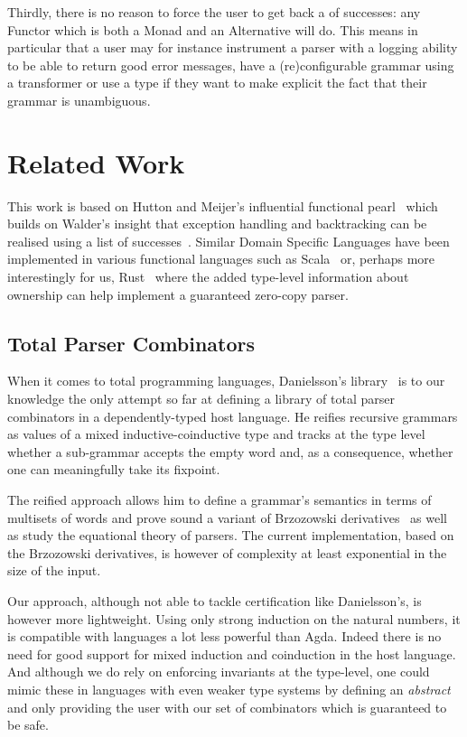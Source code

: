 Thirdly, there is no reason to force the user to get back a 
of successes: any Functor which is both a Monad and an Alternative
will do. This means in particular that a user may for instance instrument
a parser with a logging ability to be able to return good error messages,
have a (re)configurable grammar using a  transformer or use
a  type if they want to make explicit the fact that their
grammar is unambiguous.

\section{Related Work}

This work is based on Hutton and Meijer's influential functional pearl~\citeyear{hutton1998monadic}
which builds on Walder's insight that exception handling and backtracking can be
realised using a list of successes~\citeyear{wadler1985replace}. Similar Domain
Specific Languages have been implemented in various functional languages such as
Scala~\cite{moors2008parser} or, perhaps more interestingly for us, Rust~\cite{couprie2015nom}
where the added type-level information about ownership can help implement a
guaranteed zero-copy parser.

\subsection{Total Parser Combinators}

When it comes to total programming languages, Danielsson's library~\citeyear{danielsson2010total}
is to our knowledge the only attempt so far at defining a library of total
parser combinators in a dependently-typed host language. He reifies recursive
grammars as values of a mixed inductive-coinductive type and tracks at the
type level whether a sub-grammar accepts the empty word and, as a consequence,
whether one can meaningfully take its fixpoint.

The reified approach allows him to define a grammar's semantics in terms
of multisets of words and prove sound a variant of Brzozowski derivatives~\citeyear{brzozowski1964derivatives}
as well as study the equational theory of parsers. The current
implementation, based on the Brzozowski derivatives, is however of complexity
at least exponential in the size of the input.

Our approach, although not able to tackle certification like Danielsson's,
is however more lightweight. Using only strong induction on the natural
numbers, it is compatible with languages a lot less powerful than Agda.
Indeed there is no need for good support for mixed induction and coinduction
in the host language. And although we do rely on enforcing invariants
at the type-level, one could mimic these in languages with even weaker type
systems by defining an \emph{abstract} \BOX{} and only providing the user with
our set of combinators which is guaranteed to be safe.

